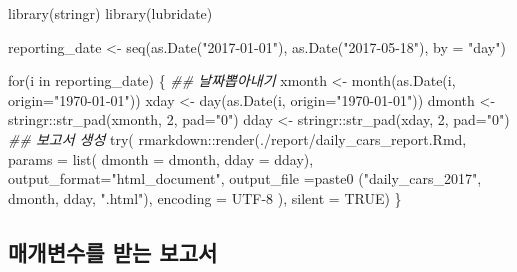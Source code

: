 \documentclass[
  letterpaper,
  chapter,a4paper,showtrims,openright,hidelinks]{oblivoir}
\newenvironment{Shaded}{\begin{snugshade}}{\end{snugshade}}
\newcommand{\AttributeTok}[1]{\textcolor[rgb]{0.40,0.45,0.13}{#1}}
\newcommand{\ConstantTok}[1]{\textcolor[rgb]{0.56,0.35,0.01}{#1}}
\newcommand{\ControlFlowTok}[1]{\textcolor[rgb]{0.00,0.23,0.31}{#1}}
\newcommand{\DecValTok}[1]{\textcolor[rgb]{0.68,0.00,0.00}{#1}}
\newcommand{\DocumentationTok}[1]{\textcolor[rgb]{0.37,0.37,0.37}{\textit{#1}}}
\newcommand{\FunctionTok}[1]{\textcolor[rgb]{0.28,0.35,0.67}{#1}}
\newcommand{\NormalTok}[1]{\textcolor[rgb]{0.00,0.23,0.31}{#1}}
\newcommand{\OtherTok}[1]{\textcolor[rgb]{0.00,0.23,0.31}{#1}}
\newcommand{\SpecialCharTok}[1]{\textcolor[rgb]{0.37,0.37,0.37}{#1}}
\newcommand{\StringTok}[1]{\textcolor[rgb]{0.13,0.47,0.30}{#1}}
\begin{document}
\begin{Shaded}
\begin{Highlighting}[]
\FunctionTok{library}\NormalTok{(stringr)}
\FunctionTok{library}\NormalTok{(lubridate)}

\NormalTok{reporting\_date }\OtherTok{\textless{}{-}} \FunctionTok{seq}\NormalTok{(}\FunctionTok{as.Date}\NormalTok{(}\StringTok{"2017{-}01{-}01"}\NormalTok{), }\FunctionTok{as.Date}\NormalTok{(}\StringTok{"2017{-}05{-}18"}\NormalTok{), }\AttributeTok{by =} \StringTok{"day"}\NormalTok{)}


\ControlFlowTok{for}\NormalTok{(i }\ControlFlowTok{in}\NormalTok{ reporting\_date) \{}
    \DocumentationTok{\#\# 날짜뽑아내기}
\NormalTok{    xmonth }\OtherTok{\textless{}{-}} \FunctionTok{month}\NormalTok{(}\FunctionTok{as.Date}\NormalTok{(i, }\AttributeTok{origin=}\StringTok{"1970{-}01{-}01"}\NormalTok{))}
\NormalTok{    xday }\OtherTok{\textless{}{-}} \FunctionTok{day}\NormalTok{(}\FunctionTok{as.Date}\NormalTok{(i, }\AttributeTok{origin=}\StringTok{"1970{-}01{-}01"}\NormalTok{))}
\NormalTok{    dmonth }\OtherTok{\textless{}{-}}\NormalTok{ stringr}\SpecialCharTok{::}\FunctionTok{str\_pad}\NormalTok{(xmonth, }\DecValTok{2}\NormalTok{, }\AttributeTok{pad=}\StringTok{"0"}\NormalTok{)}
\NormalTok{    dday }\OtherTok{\textless{}{-}}\NormalTok{ stringr}\SpecialCharTok{::}\FunctionTok{str\_pad}\NormalTok{(xday, }\DecValTok{2}\NormalTok{, }\AttributeTok{pad=}\StringTok{"0"}\NormalTok{)}
    \DocumentationTok{\#\# 보고서 생성}
    \FunctionTok{try}\NormalTok{(}
\NormalTok{        rmarkdown}\SpecialCharTok{::}\FunctionTok{render}\NormalTok{(}\StringTok{\textquotesingle{}./report/daily\_cars\_report.Rmd\textquotesingle{}}\NormalTok{,}
                      \AttributeTok{params =} \FunctionTok{list}\NormalTok{(}
                          \AttributeTok{dmonth =}\NormalTok{ dmonth,}
                          \AttributeTok{dday   =}\NormalTok{ dday),}
                      \AttributeTok{output\_format=}\StringTok{"html\_document"}\NormalTok{,}
                      \AttributeTok{output\_file =}\FunctionTok{paste0}\NormalTok{ (}\StringTok{"daily\_cars\_2017"}\NormalTok{, dmonth, dday, }\StringTok{".html"}\NormalTok{),}
                      \AttributeTok{encoding =} \StringTok{\textquotesingle{}UTF{-}8\textquotesingle{}}
\NormalTok{        ),}
    \AttributeTok{silent =} \ConstantTok{TRUE}\NormalTok{)}
\NormalTok{\}}
\end{Highlighting}
\end{Shaded}

\hypertarget{uxb9e4uxac1cuxbcc0uxc218uxb97c-uxbc1buxb294-uxbcf4uxace0uxc11c}{%
\subsection{매개변수를 받는
보고서}\label{uxb9e4uxac1cuxbcc0uxc218uxb97c-uxbc1buxb294-uxbcf4uxace0uxc11c}}
\end{document}
